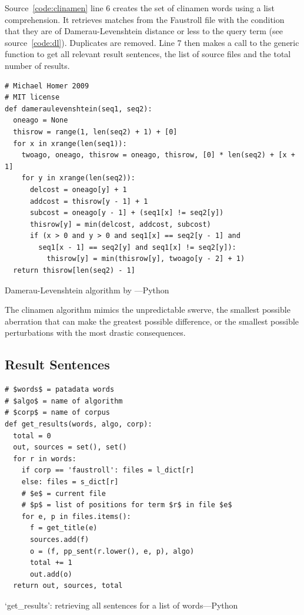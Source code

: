 Source~\ref{code:clinamen} line 6 creates the set of clinamen words using a list comprehension. It retrieves matches from the Faustroll file  with the condition that they are of Damerau-Levenshtein distance  or less to the query term  (see source~\ref{code:dl}). Duplicates are removed. Line 7 then makes a call to the generic  function to get all relevant result sentences, the list of source files and the total number of results.

\begin{listing}[!htbp] %
  \begin{verbatim}
# Michael Homer 2009
# MIT license
def dameraulevenshtein(seq1, seq2):
  oneago = None
  thisrow = range(1, len(seq2) + 1) + [0]
  for x in xrange(len(seq1)):
    twoago, oneago, thisrow = oneago, thisrow, [0] * len(seq2) + [x + 1]
    for y in xrange(len(seq2)):
      delcost = oneago[y] + 1
      addcost = thisrow[y - 1] + 1
      subcost = oneago[y - 1] + (seq1[x] != seq2[y])
      thisrow[y] = min(delcost, addcost, subcost)
      if (x > 0 and y > 0 and seq1[x] == seq2[y - 1] and
        seq1[x - 1] == seq2[y] and seq1[x] != seq2[y]):
          thisrow[y] = min(thisrow[y], twoago[y - 2] + 1)
  return thisrow[len(seq2) - 1]
  \end{verbatim}
\caption[`dameraulevenshtein' function---Python]{Damerau-Levenshtein algorithm by \autocite{Homer2009}---Python}
\label{code:dl}
\end{listing}

The clinamen algorithm mimics the unpredictable swerve, the smallest possible aberration that can make the greatest possible difference, or the smallest possible perturbations with the most drastic consequences. 


\subsection{Result Sentences}
\label{s:ressent}


\begin{listing}[!htbp] %
  \begin{verbatim}
# $words$ = patadata words
# $algo$ = name of algorithm
# $corp$ = name of corpus
def get_results(words, algo, corp):
  total = 0
  out, sources = set(), set()
  for r in words:
    if corp == 'faustroll': files = l_dict[r]
    else: files = s_dict[r]
    # $e$ = current file
    # $p$ = list of positions for term $r$ in file $e$
    for e, p in files.items():
      f = get_title(e)
      sources.add(f)
      o = (f, pp_sent(r.lower(), e, p), algo)
      total += 1
      out.add(o)
  return out, sources, total
  \end{verbatim}
\caption[`get\_results' function---Python]{`get\_results': retrieving all sentences for a list of words---Python}
\label{code:getresults}
\end{listing}

